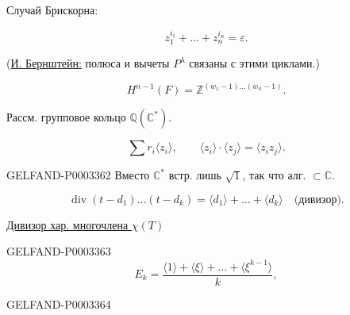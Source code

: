 Случай Брискорна:

\begin{equation*}z_1^{i_1}+\ldots+z_n^{i_n}=\varepsilon.\end{equation*}

(\uline{И. Бернштейн:} полюса и вычеты $P^\lambda$ связаны с этими циклами.)





\begin{equation*}H^{n-1}(F)=\mathbb Z^{(w_1-1)\ldots(w_n-1)}.\end{equation*}

Рассм. групповое кольцо $\mathbb Q(\mathbb C^*)$.

\begin{equation*}\sum r_i\langle z_i\rangle,\qquad\langle z_i\rangle\cdot\langle z_j\rangle=\langle z_i z_j\rangle.\end{equation*}

\begin{GelfandAdjacentEvidence}{GELFAND-P000336}{2}
Вместо $\mathbb C^*$ встр. лишь $\sqrt{1}$, так что алг. $\subset\mathbb C$.

\end{GelfandAdjacentEvidence}


\begin{equation*}\operatorname{div}(t-d_1)\ldots(t-d_k)=\langle d_1\rangle+\ldots+\langle d_k\rangle\quad\text{(дивизор).}\end{equation*}

\uline{Дивизор хар. многочлена $\chi(T)$}

\begin{GelfandAdjacentEvidence}{GELFAND-P000336}{3}
\begin{equation*}E_k=\frac{\langle1\rangle+\langle\xi\rangle+\ldots+\langle\xi^{k-1}\rangle}{k},\end{equation*}

\end{GelfandAdjacentEvidence}
\begin{GelfandAdjacentEvidence}{GELFAND-P000336}{4}






\end{GelfandAdjacentEvidence}


